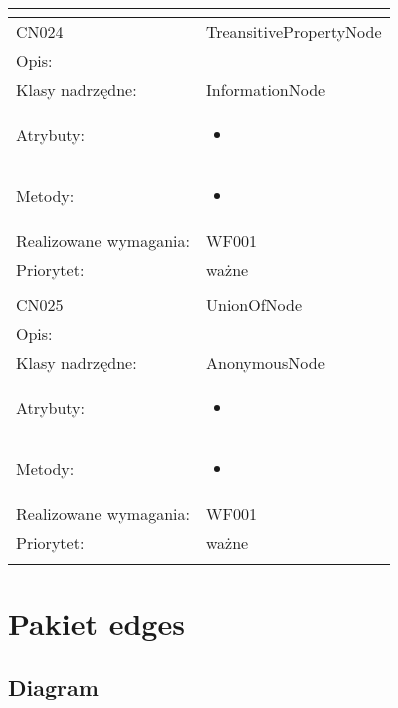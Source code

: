 \documentclass[a4paper,10pt]{article}
\begin{document}
\begin{center}
\begin{longtable}{|m{3cm}|m{9cm}|}
\multicolumn{2}{c}{} \\
 \hline

CN024 & TreansitivePropertyNode \\ \hline
Opis: &     \\ \hline
Klasy nadrzędne: & InformationNode     \\ \hline
Atrybuty: & \begin{itemize}
 \item 
\end{itemize}
 \\ \hline
Metody: & \begin{itemize}
 \item 
\end{itemize}
  \\ \hline
Realizowane wymagania: & WF001 \\ \hline
Priorytet: & ważne  \\ \hline

\multicolumn{2}{c}{} \\
 \hline

CN025 & UnionOfNode \\ \hline
Opis: &     \\ \hline
Klasy nadrzędne: & AnonymousNode     \\ \hline
Atrybuty: & \begin{itemize}
 \item 
\end{itemize}
 \\ \hline
Metody: & \begin{itemize}
 \item 
\end{itemize}
  \\ \hline
Realizowane wymagania: & WF001 \\ \hline
Priorytet: & ważne  \\ \hline

\multicolumn{2}{c}{} \\
 \hline


\end{longtable}

\end{center}

\section{Pakiet edges}

\subsection{Diagram}
\end{document}
